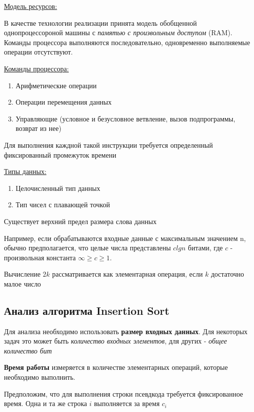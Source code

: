 \documentclass[a4paper, 12pt]{article}
\begin{document}
\underline{Модель ресурсов:}

В качестве технологии реализации принята модель обобщенной однопроцессороной машины с \textit{памятью с произвольным доступом} (RAM).
Команды процессора выполняются последовательно, одновременно выполняемые операции отсутствуют.

\underline{Команды процессора:}

\begin{enumerate}
    \item Арифметические операции
    \item Операции перемещения данных
    \item Управляющие (условное и безусловное ветвление, вызов подпрограммы, возврат из нее)
\end{enumerate}

Для выполнения каждной такой инструкции требуется определенный фиксированный промежуток времени

\underline{Типы данных:}

\begin{enumerate}
    \item Целочисленный тип данных
    \item Тип чисел с плавающей точкой
\end{enumerate}

Существует верхний предел размера слова данных

Например, если обрабатываются входные данные с максимальным значением n, обычно предполагается,
что целые числа представлены $clgn$ битами, где $c$ - произвольная константа $\infty \geq c \geq 1$.

Вычисление $2k$ рассматривается как элементарная операция, если $k$ достаточно малое число

\subsection{Анализ алгоритма Insertion Sort}

Для анализа необходимо использовать \textbf{размер входных данных}. Для некоторых задач это может быть \textit{количество входных элементов},
для других - \textit{общее количество бит}

\textbf{Время работы} измеряется в количестве элементарных операций, которые необходимо выполнить.

Предположим, что для выполнения строки псевдкода требуется фиксированное время. Одна и та же строка $i$ выполняется за время $c_i$
\end{document}
